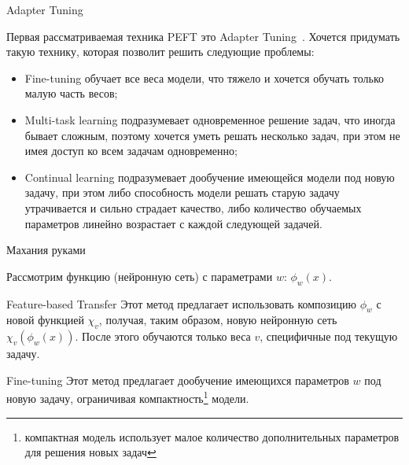 \documentclass[9pt]{beamer}
\begin{document}
\begin{frame}{Adapter Tuning}

    Первая рассматриваемая техника PEFT это Adapter Tuning~\cite{adapter}. Хочется придумать такую технику, которая позволит решить следующие проблемы:
    
    \begin{itemize}
        \item<2-> Fine-tuning обучает все веса модели, что тяжело и хочется обучать только малую часть весов;
        \item<3-> Multi-task learning подразумевает одновременное решение задач, что иногда бывает сложным, поэтому хочется уметь решать несколько задач, при этом не имея доступ ко всем задачам одновременно;
        \item<4-> Continual learning подразумевает дообучение имеющейся модели под новую задачу, при этом либо способность модели решать старую задачу утрачивается и сильно страдает качество, либо количество обучаемых параметров линейно возрастает с каждой следующей задачей.
    \end{itemize}

\end{frame}


\begin{frame}{Махания руками}

    Рассмотрим функцию (нейронную сеть) с параметрами $w$: $\phi_w(x)$.
    
    \begin{block}{Feature-based Transfer}
        Этот метод предлагает использовать композицию $\phi_w$ с новой функцией $\chi_v$, получая, таким образом, новую нейронную сеть $\chi_v(\phi_w(x))$. После этого обучаются только веса $v$, специфичные под текущую задачу.
    \end{block}

    \begin{block}{Fine-tuning}
        Этот метод предлагает дообучение имеющихся параметров $w$ под новую задачу, ограничивая компактность\footnote{компактная модель использует малое количество дополнительных параметров для решения новых задач} модели.
    \end{block}
    
\end{frame}
\end{document}
